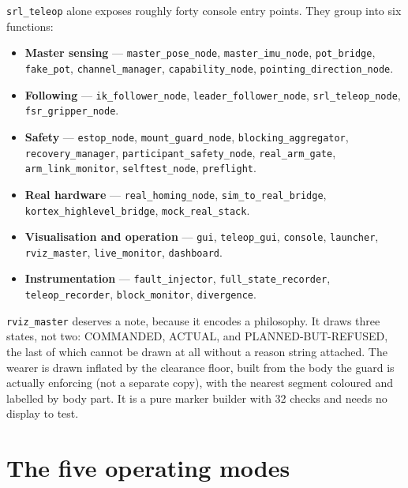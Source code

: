 \documentclass[11pt,a4paper,oneside]{report}
\newcommand{\code}[1]{\texttt{\small #1}}
\begin{document}
\code{srl\_teleop} alone exposes roughly forty console entry points. They group
into six functions:

\begin{itemize}
\item \textbf{Master sensing} --- \code{master\_pose\_node},
      \code{master\_imu\_node}, \code{pot\_bridge}, \code{fake\_pot},
      \code{channel\_manager}, \code{capability\_node},
      \code{pointing\_direction\_node}.
\item \textbf{Following} --- \code{ik\_follower\_node},
      \code{leader\_follower\_node}, \code{srl\_teleop\_node},
      \code{fsr\_gripper\_node}.
\item \textbf{Safety} --- \code{estop\_node}, \code{mount\_guard\_node},
      \code{blocking\_aggregator}, \code{recovery\_manager},
      \code{participant\_safety\_node}, \code{real\_arm\_gate},
      \code{arm\_link\_monitor}, \code{selftest\_node}, \code{preflight}.
\item \textbf{Real hardware} --- \code{real\_homing\_node},
      \code{sim\_to\_real\_bridge}, \code{kortex\_highlevel\_bridge},
      \code{mock\_real\_stack}.
\item \textbf{Visualisation and operation} --- \code{gui},
      \code{teleop\_gui}, \code{console}, \code{launcher},
      \code{rviz\_master}, \code{live\_monitor}, \code{dashboard}.
\item \textbf{Instrumentation} --- \code{fault\_injector},
      \code{full\_state\_recorder}, \code{teleop\_recorder},
      \code{block\_monitor}, \code{divergence}.
\end{itemize}

\code{rviz\_master} deserves a note, because it encodes a philosophy. It draws
three states, not two: COMMANDED, ACTUAL, and PLANNED-BUT-REFUSED, the last of
which cannot be drawn at all without a reason string attached. The wearer is
drawn inflated by the clearance floor, built from the body the guard is
actually enforcing (not a separate copy), with the nearest segment coloured and
labelled by body part. It is a pure marker builder with 32 checks and needs no
display to test.

\section{The five operating modes}
\end{document}
